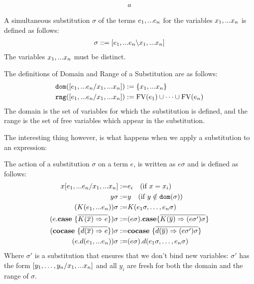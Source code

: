 \documentclass[twoside,12pt,a4paper]{article}
\begin{document}
\begin{example}
    \begin{align*}
        a
    \end{align*}
\end{example}

\begin{definition}[Substitution]
    A simultaneous substitution $\sigma$ of the terms $e_1,...e_n$ for the variables $x_1,...x_n$ is defined as follows:
    \begin{align*}
        \sigma ::= [e_1,...e_n \backslash x_1,...x_n]
    \end{align*}
    The variables $x_1,...x_n$ must be distinct.
\end{definition}

\begin{definition}
    The definitions of Domain and Range of a Substitution are as follows:
    \begin{align*}
        \texttt{dom}([e_1,...e_n/x_1,...x_n]) &:= \{x_1,...x_n\}\\
        \texttt{rng}([e_1,...e_n/x_1,...x_n]) &:= \text{FV}(e_1)\cup \dots\cup\text{FV}(e_n)
    \end{align*}
    The domain is the set of variables for which the substitution is defined, and
    the range is the set of free variables which appear in the substitution. 
\end{definition}

The interesting thing however, is what happens when we apply a substitution to an expression:

\begin{definition}
    The action of a substitution $\sigma$ on a term $e$, is written as $e \sigma$ and is defined as follows:
    \begin{align*}
        x[e_1,...e_n / x_1,...x_n] :=& e_i \quad(\text{if } x=x_i) \\
        y\sigma :=& y\quad (\text{if }y\notin \texttt{dom}(\sigma))\\
        (K(e_1,...e_n))\sigma :=& K(e_1 \sigma,\dots , e_n \sigma)\\
        (e.\textbf{case}\ \{\overline{K(\overline{x})\Rightarrow e}\})\sigma:=& (e\sigma).\textbf{case}\{\overline{K(\overline{y})\Rightarrow (e\sigma')\sigma}\}\\
        (\textbf{cocase}\ \{\overline{d(\overline{x})\Rightarrow e}\})\sigma:=& \textbf{cocase}\ \{\overline{d(\overline{y})\Rightarrow(e\sigma')\sigma}\}\\
        (e.d(e_1,...e_n)) \sigma:=& (e \sigma).d(e_1 \sigma,\dots , e_n \sigma)
    \end{align*} 
    Where $\sigma'$ is a substitution that ensures that we don't bind new variables: 
    $\sigma'$ has the form $[y_1,\dots, y_n/x_1,...x_n]$ and all $y_i$ are fresh for both the domain and the range of $\sigma$.
\end{definition}
\end{document}
